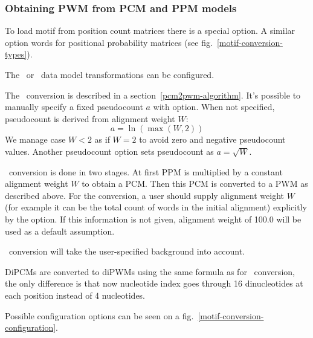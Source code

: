 \subsubsection{Obtaining PWM from PCM and PPM models}
To load motif from position count matrices there is a special  option.
A similar option  words for positional probability matrices (see fig.~\ref{motif-conversion-types}).

The \PcmToPwm\ or \PpmToPwm\ data model transformations can be configured.

The \PcmToPwm\ conversion is described in a section~\ref{pcm2pwm-algorithm}. It's possible to manually specify a fixed pseudocount $a$ with  option. When not specified, pseudocount is derived from alignment weight $W$:
$$a =\ln(\max(W,2))$$
We manage case $W<2$ as if $W=2$ to avoid zero and negative pseudocount values.
Another pseudocount option  sets pseudocount as $a=\sqrt{W}$.

\PpmToPwm\ conversion is done in two stages. At first PPM is multiplied by a constant alignment weight $W$ to obtain a PCM. Then this PCM is converted to a PWM as described above.
For the \PpmToPwm conversion, a user should supply alignment weight $W$ (for example it can be the total count of words in the initial alignment) explicitly by the  option. If this information is not given, alignment weight of 100.0 will be used as a default assumption.

\PcmToPwm\ conversion will take the user-specified background into account.

DiPCMs are converted to diPWMs using the same formula as for \PcmToPwm\ conversion, the only difference is that now nucleotide index goes through 16 dinucleotides at each position instead of 4 nucleotides.

Possible configuration options can be seen on a fig.~\ref{motif-conversion-configuration}.

